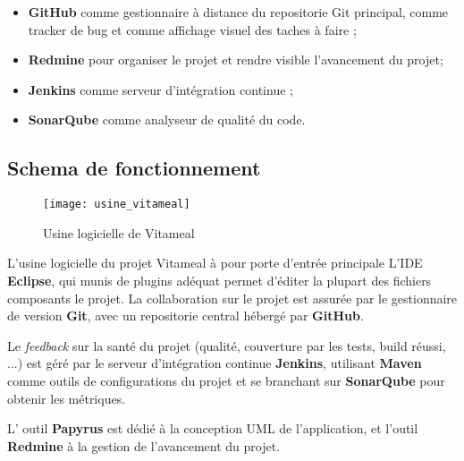 \begin{itemize}
	\item \textbf{GitHub} comme gestionnaire à distance du repositorie Git principal, comme tracker de bug et comme affichage visuel des taches à faire ;
	\item \textbf{Redmine} pour organiser le projet et rendre visible l'avancement du projet;
	\item \textbf{Jenkins} comme serveur d'intégration continue ;
	\item \textbf{SonarQube} comme analyseur de qualité du code.
\end{itemize}

\subsection{Schema de fonctionnement}

\begin{figure}[H]
	\label{Usine logicielle de Vitameal}
	\centering
	\texttt{[image: usine\_vitameal]} %
	\caption{Usine logicielle de Vitameal}
\end{figure}


L'usine logicielle du projet Vitameal à pour porte d'entrée principale L'IDE  \textbf{Eclipse}, qui munis de plugins adéquat permet d'éditer la plupart des fichiers composants le projet.  
La collaboration sur le projet est assurée par le gestionnaire de version  \textbf{Git}, avec un repositorie central hébergé par \textbf{GitHub}.

Le  \textit{feedback} sur la santé du projet (qualité, couverture par les tests, build réussi, ...) est géré par le serveur d'intégration continue  \textbf{Jenkins}, utilisant \textbf{Maven} comme outils de configurations du projet et se branchant sur \textbf{SonarQube} pour obtenir les métriques.

L' outil  \textbf{Papyrus} est dédié à la conception UML de l'application, et l'outil  \textbf{Redmine} à la gestion de l'avancement du projet.




